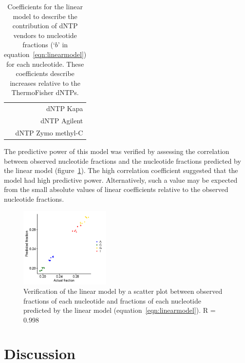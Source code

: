 \documentclass[a4paper, numbers=noenddot]{scrbook}
\begin{document}
\begin{table}[h]
  \centering
  \begin{tabular}{r}
    \toprule
    \\
    \midrule
    dNTP Kapa\\
    dNTP Agilent\\
    dNTP Zymo methyl-C\\
    \bottomrule
  \end{tabular}%
  \caption{Coefficients for the linear model to describe the contribution of dNTP vendors to nucleotide fractions (`$b$' in equation~\ref{eqn:linearmodel}) for each nucleotide.  These coefficients describe increases relative to the ThermoFisher dNTPs.}
  \label{tab:linearmodel_coeffs_b}
\end{table}

The predictive power of this model was verified by assessing the correlation between observed nucleotide fractions and the nucleotide fractions predicted by the linear model (figure~\ref{fig:linearmodel_ver}).  The high correlation coefficient suggested that the model had high predictive power.  Alternatively, such a value may be expected from the small absolute values of linear coefficients relative to the observed nucleotide fractions.

\begin{figure}[htbp]
  \centering
  \includegraphics[width=0.4\textwidth]{linearmodel_plot}
  \caption{Verification of the linear model by a scatter plot between observed fractions of each nucleotide and fractions of each nucleotide predicted by the linear model (equation~\ref{eqn:linearmodel}).  R = 0.998}
  \label{fig:linearmodel_ver}
\end{figure}

\section{Discussion}
\label{sec:pcrbias_discussion}
\end{document}
